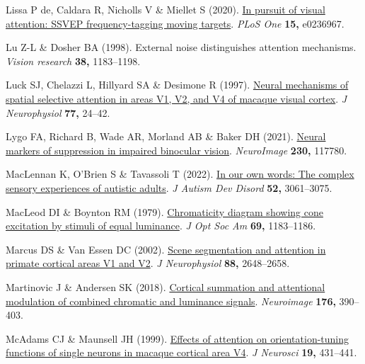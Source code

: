 \documentclass[
  letterpaper,
  DIV=11,
  numbers=noendperiod]{scrartcl}
\newlength{\cslhangindent}
\newenvironment{CSLReferences}[2] %
 {\begin{list}{}{%
  \setlength{\itemindent}{0pt}
  \setlength{\leftmargin}{0pt}
  \setlength{\parsep}{0pt}
  \ifodd #1
   \setlength{\leftmargin}{\cslhangindent}
   \setlength{\itemindent}{-1\cslhangindent}
  \fi
  \setlength{\itemsep}{#2\baselineskip}}}
 {\end{list}}
\begin{document}
\begin{CSLReferences}{1}{1}
Lissa P de, Caldara R, Nicholls V \& Miellet S (2020).
\href{https://doi.org/10.1371/journal.pone.0236967}{In pursuit of visual
attention: SSVEP frequency-tagging moving targets}. \emph{PLoS One}
\textbf{15,} e0236967.

Lu Z-L \& Dosher BA (1998). External noise distinguishes attention
mechanisms. \emph{Vision research} \textbf{38,} 1183--1198.

Luck SJ, Chelazzi L, Hillyard SA \& Desimone R (1997).
\href{https://doi.org/10.1152/jn.1997.77.1.24}{Neural mechanisms of
spatial selective attention in areas V1, V2, and V4 of macaque visual
cortex}. \emph{J Neurophysiol} \textbf{77,} 24--42.

Lygo FA, Richard B, Wade AR, Morland AB \& Baker DH (2021).
\href{https://doi.org/10.1016/j.neuroimage.2021.117780}{Neural markers
of suppression in impaired binocular vision}. \emph{NeuroImage}
\textbf{230,} 117780.

MacLennan K, O'Brien S \& Tavassoli T (2022).
\href{https://doi.org/10.1007/s10803-021-05186-3}{In our own words: The
complex sensory experiences of autistic adults}. \emph{J Autism Dev
Disord} \textbf{52,} 3061--3075.

MacLeod DI \& Boynton RM (1979).
\href{https://doi.org/10.1364/josa.69.001183}{Chromaticity diagram
showing cone excitation by stimuli of equal luminance}. \emph{J Opt Soc
Am} \textbf{69,} 1183--1186.

Marcus DS \& Van Essen DC (2002).
\href{https://doi.org/10.1152/jn.00916.2001}{Scene segmentation and
attention in primate cortical areas V1 and V2}. \emph{J Neurophysiol}
\textbf{88,} 2648--2658.

Martinovic J \& Andersen SK (2018).
\href{https://doi.org/10.1016/j.neuroimage.2018.04.066}{Cortical
summation and attentional modulation of combined chromatic and luminance
signals}. \emph{Neuroimage} \textbf{176,} 390--403.

McAdams CJ \& Maunsell JH (1999).
\href{https://doi.org/10.1523/JNEUROSCI.19-01-00431.1999}{Effects of
attention on orientation-tuning functions of single neurons in macaque
cortical area V4}. \emph{J Neurosci} \textbf{19,} 431--441.


\end{CSLReferences}
\end{document}
